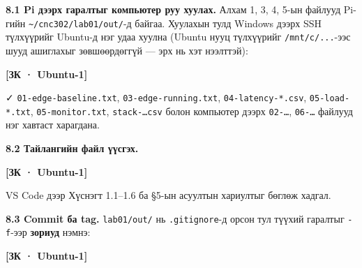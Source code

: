 \textbf{8.1 Pi дээрх гаралтыг компьютер руу хуулах.} Алхам 1, 3, 4, 5-ын файлууд Pi-гийн \texttt{\textasciitilde{}/cnc302/lab01/out/}-д байгаа. Хуулахын тулд Windows дээрх SSH түлхүүрийг Ubuntu-д нэг удаа хуулна (Ubuntu нууц түлхүүрийг \texttt{/mnt/c/...}-ээс шууд ашиглахыг зөвшөөрдөггүй --- эрх нь хэт нээлттэй):

\textbf{{[}ЗК · Ubuntu-1{]}}

\begin{Shaded}
\begin{Highlighting}[]
\KeywordTok{\&\&} 
\OperatorTok{\textless{}}\OperatorTok{\textgreater{}}
\end{Highlighting}
\end{Shaded}

✓ \texttt{01-edge-baseline.\allowbreak{}txt}, \texttt{03-edge-running.\allowbreak{}txt}, \texttt{04-latency-*.csv}, \texttt{05-load-*.txt}, \texttt{05-monitor.txt}, \texttt{stack-\ldots{}csv} болон компьютер дээрх \texttt{02-\ldots{}}, \texttt{06-\ldots{}} файлууд нэг хавтаст харагдана.

\textbf{8.2 Тайлангийн файл үүсгэх.}

\textbf{{[}ЗК · Ubuntu-1{]}}

\begin{Shaded}
\begin{Highlighting}[]
\end{Highlighting}
\end{Shaded}

VS Code дээр Хүснэгт 1.1--1.6 ба §5-ын асуултын хариултыг бөглөж хадгал.

\textbf{8.3 Commit ба tag.} \texttt{lab01/out/} нь \texttt{.gitignore}-д орсон тул түүхий гаралтыг \texttt{-f}-ээр \textbf{зориуд} нэмнэ:

\textbf{{[}ЗК · Ubuntu-1{]}}

